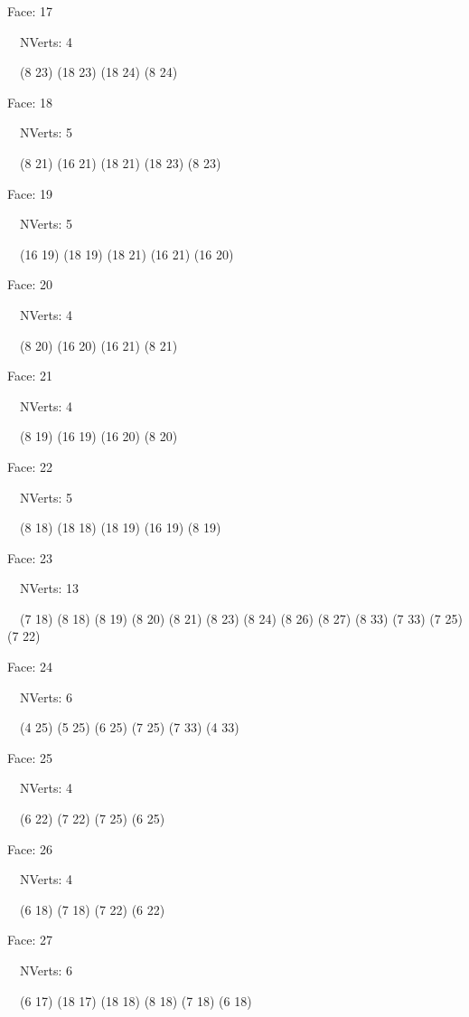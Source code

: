\documentclass{article}
\begin{document}
{\footnotesize 

Face: 17

\   \    NVerts: 4

 \   \   (8 23) (18 23) (18 24) (8 24)}

{\footnotesize 

Face: 18

\   \    NVerts: 5

 \   \   (8 21) (16 21) (18 21) (18 23) (8 23)}

{\footnotesize 

Face: 19

\   \    NVerts: 5

 \   \   (16 19) (18 19) (18 21) (16 21) (16 20)}

{\footnotesize 

Face: 20

\   \    NVerts: 4

 \   \   (8 20) (16 20) (16 21) (8 21)}

{\footnotesize 

Face: 21

\   \    NVerts: 4

 \   \   (8 19) (16 19) (16 20) (8 20)}

{\footnotesize 

Face: 22

\   \    NVerts: 5

 \   \   (8 18) (18 18) (18 19) (16 19) (8 19)}

{\footnotesize 

Face: 23

\   \    NVerts: 13

 \   \   (7 18) (8 18) (8 19) (8 20) (8 21) (8 23) (8 24) (8 26) (8 27) (8 33) (7 33) (7 25) (7 22)}

{\footnotesize 

Face: 24

\   \    NVerts: 6

 \   \   (4 25) (5 25) (6 25) (7 25) (7 33) (4 33)}

{\footnotesize 

Face: 25

\   \    NVerts: 4

 \   \   (6 22) (7 22) (7 25) (6 25)}

{\footnotesize 

Face: 26

\   \    NVerts: 4

 \   \   (6 18) (7 18) (7 22) (6 22)}

{\footnotesize 

Face: 27

\   \    NVerts: 6

 \   \   (6 17) (18 17) (18 18) (8 18) (7 18) (6 18)}
\end{document}
